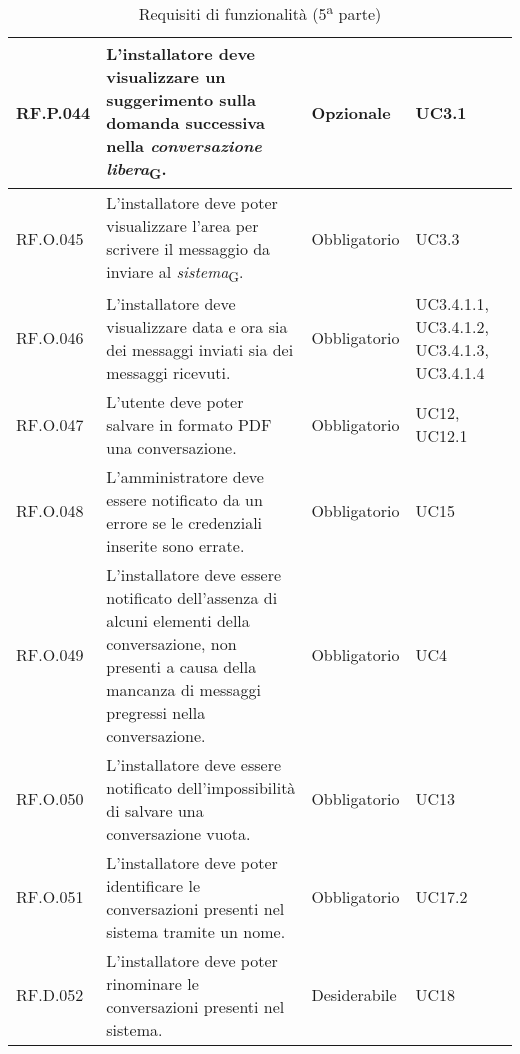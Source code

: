 \begin{table}[H]
\centering
    \begin{tabular}{|C{2.7cm}|L{6.5cm}|C{2.7cm}|C{2.7cm}|}
        \hline
        RF.P.044 & L'installatore deve visualizzare un suggerimento sulla domanda successiva nella \textit{conversazione libera}\textsubscript{G}. & Opzionale & UC3.1 \\ \hline
        RF.O.045 & L'installatore deve poter visualizzare l'area per scrivere il messaggio da inviare al \textit{sistema}\textsubscript{G}. & Obbligatorio & UC3.3 \\ \hline
        RF.O.046 & L'installatore deve visualizzare data e ora sia dei messaggi inviati sia dei messaggi ricevuti. & Obbligatorio & UC3.4.1.1, UC3.4.1.2, UC3.4.1.3, UC3.4.1.4 \\ \hline
        RF.O.047 & L'utente deve poter salvare in formato PDF una conversazione. & Obbligatorio & UC12, UC12.1 \\ \hline
        RF.O.048 & L'amministratore deve essere notificato da un errore se le credenziali inserite sono errate. & Obbligatorio & UC15 \\ \hline
        RF.O.049 & L'installatore deve essere notificato dell'assenza di alcuni elementi della conversazione, non presenti a causa della mancanza di messaggi pregressi nella conversazione. & Obbligatorio & UC4 \\ \hline
        RF.O.050 & L'installatore deve essere notificato dell'impossibilità di salvare una conversazione vuota. & Obbligatorio & UC13
        \\ \hline
        RF.O.051 & L'installatore deve poter identificare le conversazioni presenti nel sistema tramite un nome. & Obbligatorio & UC17.2
        \\ \hline
        RF.D.052 & L'installatore deve poter rinominare le conversazioni presenti nel sistema. & Desiderabile & UC18
        \\ \hline
    \end{tabular}
    \caption{Requisiti di funzionalità (5\textsuperscript{a}  parte)}
\end{table}

\newpage